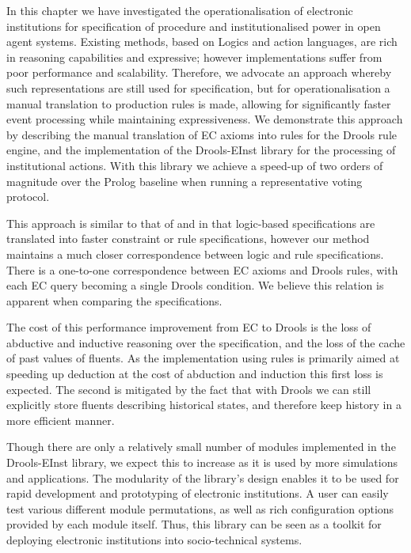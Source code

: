 In this chapter we have investigated the operationalisation of electronic
institutions for specification of procedure and institutionalised power in
open agent systems. Existing methods, based on Logics and action languages,
are rich in reasoning capabilities and expressive; however implementations
suffer from poor performance and scalability. Therefore, we advocate an
approach whereby such representations are still used for specification, but
for operationalisation a manual translation to production rules is made, allowing for
significantly faster event processing while maintaining expressiveness. We
demonstrate this approach by describing the manual translation of \ac{EC} axioms into
rules for the Drools rule engine, and the implementation of the Drools-EInst
library for the processing of institutional actions. With this library we
achieve a speed-up of two orders of magnitude over the Prolog baseline when
running a representative voting protocol.

This approach is similar to that of \citet{Arcos2005} and
\citet{Aldewereld2006} in that logic-based specifications are translated into
faster constraint or rule specifications, however our method maintains a much
closer correspondence between logic and rule specifications. There is a 
one-to-one correspondence between \ac{EC} axioms and Drools rules, with each
\ac{EC} query becoming a single Drools condition. We believe this relation is
apparent when comparing the specifications.

The cost of this performance improvement from \ac{EC} to Drools is the loss of
abductive and inductive reasoning over the specification, and the loss of the
cache of past values of fluents. As the implementation using rules is
primarily aimed at speeding up deduction at the cost of abduction and
induction this first loss is expected. The second is mitigated by the fact
that with Drools we can still explicitly store fluents describing historical
states, and therefore keep history in a more efficient manner.

Though there are only a relatively small number of modules implemented in the 
Drools-EInst library, we expect this to increase as it is used by more simulations
and applications. The modularity of the library's design enables it to be used
for rapid development and prototyping of electronic institutions. A user can
easily test various different module permutations, as well as rich
configuration options provided by each module itself. Thus, this library can
be seen as a toolkit for deploying electronic institutions into socio-technical 
systems.

